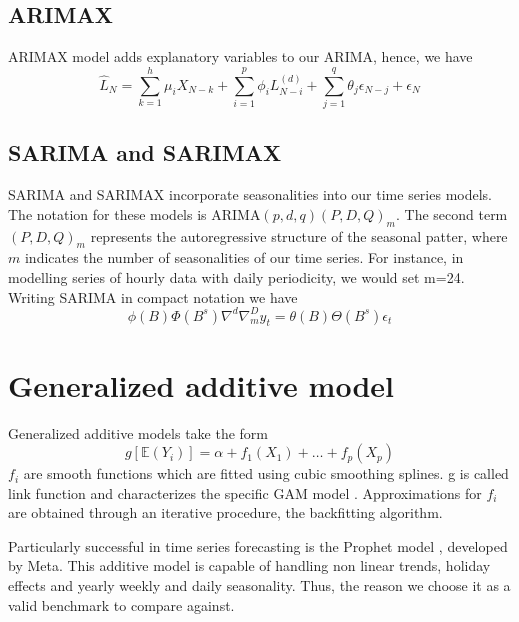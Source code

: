 \subsection{ARIMAX}
ARIMAX model adds explanatory variables to our ARIMA, hence, we have
\begin{equation}
    \hat{L}_N=\sum\limits_{k=1}^{h} \mu_i X_{N-k}+\sum\limits_{i=1}^{p}\phi_i L_{N-i}^{(d)}+\sum\limits_{j=1}^{q}\theta_j \epsilon_{N-j}+ \epsilon_{N}
\end{equation}
\subsection{SARIMA and SARIMAX}
SARIMA and SARIMAX incorporate seasonalities into our time series models. The notation for these models is ARIMA$(p,d,q)(P,D,Q)_m$. The second term $(P,D,Q)_m$ represents the autoregressive structure of the seasonal patter, where $m$ indicates the number of seasonalities of our time series.
For instance, in modelling series of hourly data with daily periodicity, we would set m=24.
Writing SARIMA in compact notation we have
\\
\begin{equation}
    \phi(B)\Phi(B^s)\nabla^d\nabla_m^Dy_t=\theta(B)\Theta(B^s)\epsilon_t
\end{equation}

\section{Generalized additive model}
Generalized additive models take the form
\begin{equation}
    g[\mathbb{E}(Y_i)]=\alpha+f_1(X_1)+\dots+f_p(X_p)
\end{equation}
$f_i$ are smooth functions which are fitted using cubic smoothing splines.
g is called link function and characterizes the specific GAM model \cite{hastie2017generalized}. Approximations for $f_i$ are obtained through an iterative procedure, the backfitting algorithm.

Particularly successful in time series forecasting is the Prophet model \cite{taylor2018forecasting}, developed by Meta. This additive model is capable of handling non linear trends, holiday effects and yearly weekly and daily seasonality. Thus, the reason we choose it as a valid benchmark to compare against.
